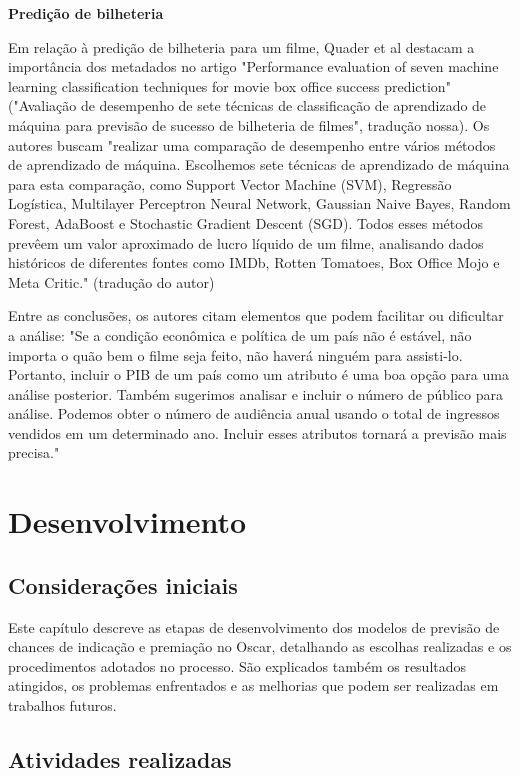         \textbf{Predição de bilheteria}\par
        Em relação à predição de bilheteria para um filme, Quader et al destacam a importância dos metadados no artigo "Performance evaluation of seven machine learning classification techniques for movie box office success prediction" ("Avaliação de desempenho de sete técnicas de classificação de aprendizado de máquina para previsão de sucesso de bilheteria de filmes", tradução nossa). Os autores buscam "realizar uma comparação de desempenho entre vários métodos de aprendizado de máquina. Escolhemos sete técnicas de aprendizado de máquina para esta comparação, como Support Vector Machine (SVM), Regressão Logística, Multilayer Perceptron Neural Network, Gaussian Naive Bayes, Random Forest, AdaBoost e Stochastic Gradient Descent (SGD). Todos esses métodos prevêem um valor aproximado de lucro líquido de um filme, analisando dados históricos de diferentes fontes como IMDb, Rotten Tomatoes, Box Office Mojo e Meta Critic." \cite{quader2017} (tradução do autor)\par
        Entre as conclusões, os autores citam elementos que podem facilitar ou dificultar a análise: "Se a condição econômica e política de um país não é estável, não importa o quão bem o filme seja feito, não haverá ninguém para assisti-lo. Portanto, incluir o PIB de um país como um atributo é uma boa opção para uma análise posterior. Também sugerimos analisar e incluir o número de público para análise. Podemos obter o número de audiência anual usando o total de ingressos vendidos em um determinado ano. Incluir esses atributos tornará a previsão mais precisa."
    
    \section[Desenvolvimento]{Desenvolvimento}

        \subsection{Considerações iniciais}
        Este capítulo descreve as etapas de desenvolvimento dos modelos de previsão de chances de indicação e premiação no Oscar, detalhando as escolhas realizadas e os procedimentos adotados no processo. São explicados também os resultados atingidos, os problemas enfrentados e as melhorias que podem ser realizadas em trabalhos futuros.
    
        \subsection{Atividades realizadas}
    

